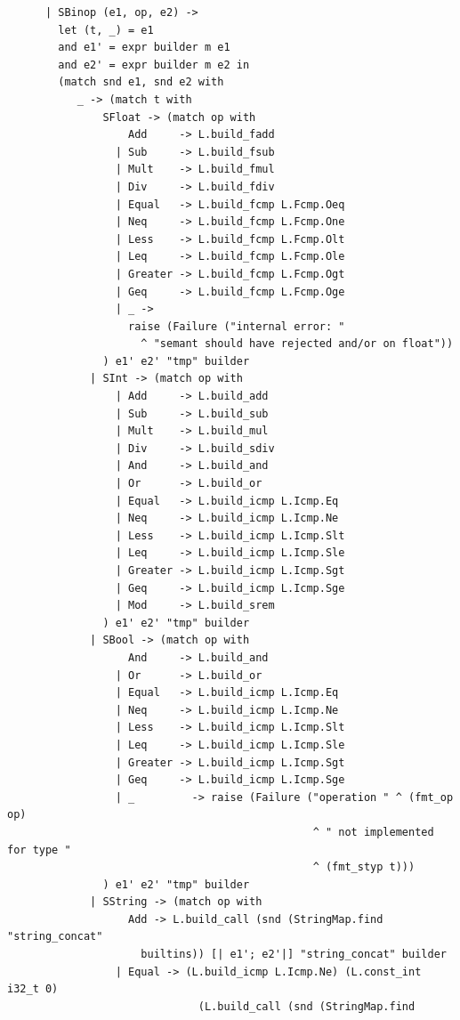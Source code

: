 \documentclass[12pt]{article}
\begin{document}
\begin{mdframed}[hidealllines=true,backgroundcolor=blue!20]
\begin{lstlisting}
      | SBinop (e1, op, e2) -> 
        let (t, _) = e1
        and e1' = expr builder m e1
        and e2' = expr builder m e2 in
        (match snd e1, snd e2 with
           _ -> (match t with
               SFloat -> (match op with
                   Add     -> L.build_fadd
                 | Sub     -> L.build_fsub
                 | Mult    -> L.build_fmul
                 | Div     -> L.build_fdiv
                 | Equal   -> L.build_fcmp L.Fcmp.Oeq
                 | Neq     -> L.build_fcmp L.Fcmp.One
                 | Less    -> L.build_fcmp L.Fcmp.Olt
                 | Leq     -> L.build_fcmp L.Fcmp.Ole
                 | Greater -> L.build_fcmp L.Fcmp.Ogt
                 | Geq     -> L.build_fcmp L.Fcmp.Oge
                 | _ ->
                   raise (Failure ("internal error: " 
                     ^ "semant should have rejected and/or on float"))
               ) e1' e2' "tmp" builder
             | SInt -> (match op with
                 | Add     -> L.build_add
                 | Sub     -> L.build_sub
                 | Mult    -> L.build_mul
                 | Div     -> L.build_sdiv
                 | And     -> L.build_and
                 | Or      -> L.build_or
                 | Equal   -> L.build_icmp L.Icmp.Eq
                 | Neq     -> L.build_icmp L.Icmp.Ne
                 | Less    -> L.build_icmp L.Icmp.Slt
                 | Leq     -> L.build_icmp L.Icmp.Sle
                 | Greater -> L.build_icmp L.Icmp.Sgt
                 | Geq     -> L.build_icmp L.Icmp.Sge
                 | Mod     -> L.build_srem
               ) e1' e2' "tmp" builder
             | SBool -> (match op with
                   And     -> L.build_and
                 | Or      -> L.build_or
                 | Equal   -> L.build_icmp L.Icmp.Eq
                 | Neq     -> L.build_icmp L.Icmp.Ne
                 | Less    -> L.build_icmp L.Icmp.Slt
                 | Leq     -> L.build_icmp L.Icmp.Sle
                 | Greater -> L.build_icmp L.Icmp.Sgt
                 | Geq     -> L.build_icmp L.Icmp.Sge
                 | _         -> raise (Failure ("operation " ^ (fmt_op op)
                                                ^ " not implemented for type " 
                                                ^ (fmt_styp t)))
               ) e1' e2' "tmp" builder
             | SString -> (match op with
                   Add -> L.build_call (snd (StringMap.find "string_concat" 
                     builtins)) [| e1'; e2'|] "string_concat" builder
                 | Equal -> (L.build_icmp L.Icmp.Ne) (L.const_int i32_t 0)
                              (L.build_call (snd (StringMap.find 

\end{lstlisting}
\end{mdframed}
\end{document}
